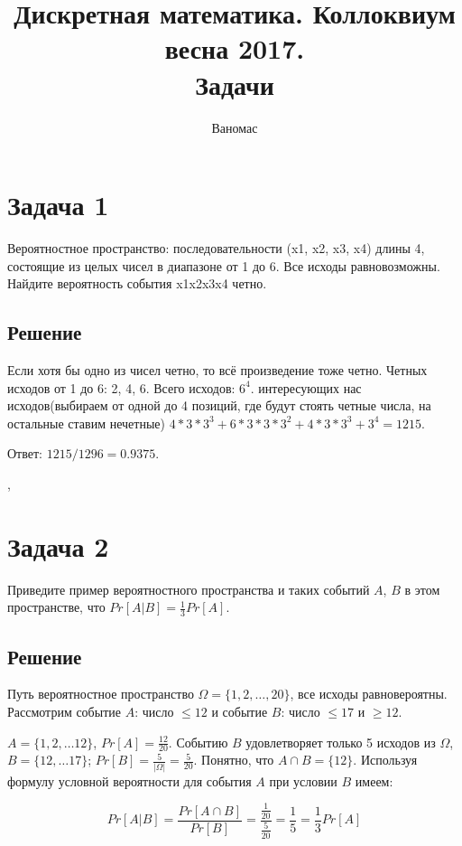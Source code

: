 \documentclass[a4paper,12pt]{article}
\newcommand {\gu} [1] {\guillemotleft#1\guillemotright}
\begin{document}
	\title{Дискретная математика. Коллоквиум весна 2017. \\ Задачи}
	\author{Ваномас}
	\maketitle
\section*{Задача 1}
    
    Вероятностное пространство: последовательности (x1, x2, x3, x4) длины 4, состоящие из целых чисел в диапазоне от 1 до 6. Все исходы равновозможны. Найдите вероятность события x1x2x3x4 четно.
    
    \subsection*{Решение}
    
    Если хотя бы одно из чисел четно, то всё произведение тоже четно. Четных исходов от 1 до 6: 2, 4, 6. Всего исходов: $6^4$. интересующих нас исходов(выбираем от одной до 4 позиций, где будут стоять четные числа, на остальные ставим нечетные) $4 * 3 * 3^3 + 6 * 3 * 3 * 3^2 + 4 * 3 * 3^3 + 3^4 = 1215. $
    
    Ответ: $1215/1296 = 0.9375$.
    
    \sep
    \section*{Задача 2}
    Приведите пример вероятностного пространства и таких событий $A$, $B$ в этом пространстве, что $Pr[A|B] = \frac{1}{3}Pr[A]$.

    \subsection*{Решение}
        Путь вероятностное пространство $\Omega = \{1, 2, \ldots, 20\}$, все исходы равновероятны. Рассмотрим событие $A$: \gu{число $\le 12$} и событие $B$: \gu{число $\le 17$ и $\ge 12$}. 
        
        $A = \{1, 2, \ldots 12\}$, $Pr[A] = \frac{12}{20}$. Событию $B$ удовлетворяет только 5 исходов из $\Omega$, $B = \{12, \ldots 17\}$; $Pr[B] = \frac{5}{|\Omega|} = \frac{5}{20}$. Понятно, что $A \cap B = \{12\}$. Используя формулу условной вероятности для события $A$ при условии $B$ имеем:

            $$ Pr[A|B] = \frac{Pr[A \cap B]}{Pr[B]} = \frac{\frac{1}{20}}{\frac{5}{20}} = \frac{1}{5} = \frac{1}{3} Pr[A]$$
\end{document}
